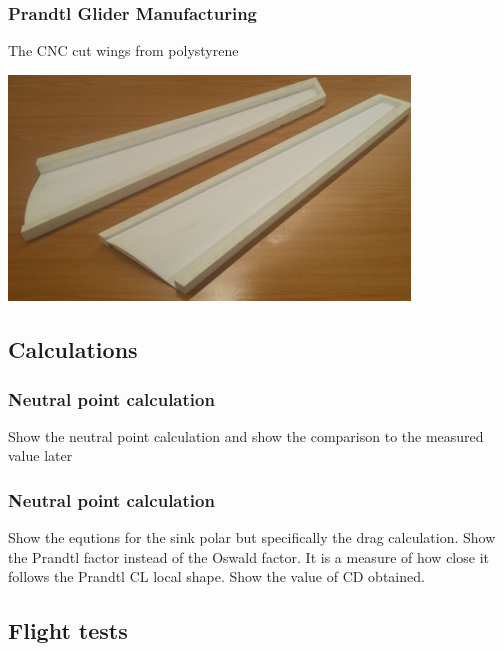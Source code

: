 \documentclass{beamer}
\begin{document}
\begin{frame}
\frametitle{Prandtl Glider Manufacturing}

The CNC cut wings from polystyrene

\begin{center}
\includegraphics[width = 0.8\textwidth]{Pictures/PolystyreneCut.jpg}
\end{center}

\end{frame}





\subsection{Calculations} %

\begin{frame}
\frametitle{Neutral point calculation}
Show the neutral point calculation and show the comparison to the measured value later


\end{frame}


\begin{frame}
\frametitle{Neutral point calculation}
Show the equtions for the sink polar but specifically the drag calculation.  Show the Prandtl factor instead of the Oswald factor.  It is a measure of how close it follows the Prandtl CL local shape.
Show the value of CD obtained.


\end{frame}




\subsection{Flight tests}
\end{document}
